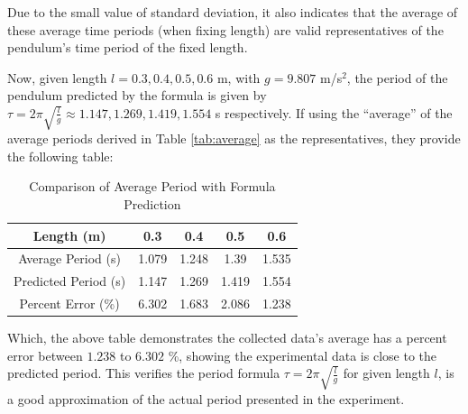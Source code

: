 \documentclass{article}
\begin{document}
Due to the small value of standard deviation, it also indicates that the average of these average time periods (when fixing length) are valid representatives of the pendulum's time period of the fixed length.

\hfil

Now, given length $l = 0.3,0.4,0.5,0.6$ m, with $g=9.807$ m/s$^2$, the period of the pendulum predicted by the formula is given by $\tau = 2\pi \sqrt{\frac{l}{g}} \approx 1.147, 1.269, 1.419, 1.554$ s respectively. If using the ``average'' of the average periods derived in Table \ref{tab:average} as the representatives, they provide the following table:
\begin{table}[ht!]
    \centering
    \begin{tabular}{c||c|c|c|c}
        \toprule
        Length (m) & 0.3 & 0.4 & 0.5 & 0.6\\
        \hline
        Average Period (s) & 1.079 & 1.248 & 1.39 & 1.535\\
        \hline
        Predicted Period (s) & 1.147 & 1.269 & 1.419 & 1.554\\
        \hline
        \hline
        Percent Error (\%) & 6.302 & 1.683 & 2.086 & 1.238\\
        \bottomrule
    \end{tabular}
    \caption{Comparison of Average Period with Formula Prediction}
    \label{tab:compare}
\end{table}

Which, the above table demonstrates the collected data's average has a percent error between $1.238$ to $6.302$ \%, showing the experimental data is close to the predicted period. This verifies the period formula $\tau = 2\pi\sqrt{\frac{l}{g}}$ for given length $l$, is a good approximation of the actual period presented in the experiment.

\pagebreak
\end{document}
